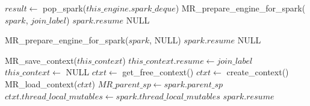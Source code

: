 \begin{algorithm}
\begin{algorithmic}
    \State $result \gets$ pop\_spark($this\_engine.spark\_deque$)
        \State MR\_prepare\_engine\_for\_spark($spark$, $join\_label$)
        \State \Return $spark.resume$
    \Else
        \State \Return NULL
    \EndIf
\EndProcedure
\end{algorithmic}
\end{algorithm}

\begin{algorithm}
\begin{algorithmic}
            \State MR\_prepare\_engine\_for\_spark($spark$, NULL)
            \State \Return $spark.resume$
        \EndIf
    \EndIf
    \State \Return NULL
\EndProcedure
\end{algorithmic}
\end{algorithm}

\begin{algorithm}
\begin{algorithmic}
        \State MR\_save\_context($this\_context$)
        \State $this\_context.resume \gets join\_label$
        \State $this\_context \gets$ NULL
    \EndIf
        \State $ctxt \gets$ get\_free\_context()
            \State $ctxt \gets$ create\_context()
        \EndIf
        \State MR\_load\_context($ctxt$)
    \EndIf
    \State $MR\_parent\_sp \gets spark.parent\_sp$
    \State $ctxt.thread\_local\_mutables \gets
      spark.thread\_local\_mutables$
    \State \Return $spark.resume$
\EndProcedure
\end{algorithmic}
\end{algorithm}

